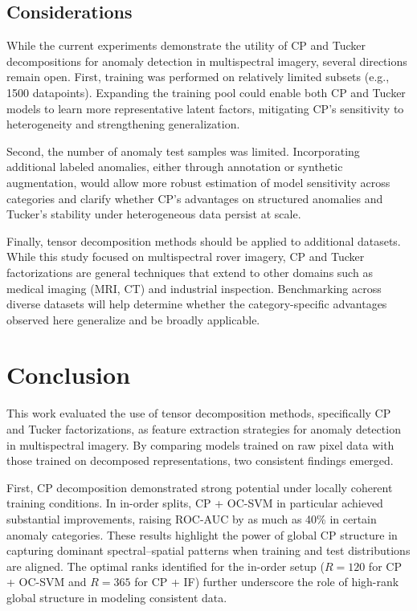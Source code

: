 \documentclass[pdflatex,sn-mathphys-ay]{sn-jnl}
\begin{document}
\subsection{Considerations}

While the current experiments demonstrate the utility of CP and Tucker decompositions for anomaly detection in multispectral imagery, several directions remain open. First, training was performed on relatively limited subsets (e.g., 1500 datapoints). Expanding the training pool could enable both CP and Tucker models to learn more representative latent factors, mitigating CP’s sensitivity to heterogeneity and strengthening generalization.  

Second, the number of anomaly test samples was limited. Incorporating additional labeled anomalies, either through annotation or synthetic augmentation, would allow more robust estimation of model sensitivity across categories and clarify whether CP’s advantages on structured anomalies and Tucker’s stability under heterogeneous data persist at scale.  

Finally, tensor decomposition methods should be applied to additional datasets. While this study focused on multispectral rover imagery, CP and Tucker factorizations are general techniques that extend to other domains such as medical imaging (MRI, CT) and industrial inspection. Benchmarking across diverse datasets will help determine whether the category-specific advantages observed here generalize and be broadly applicable.  


\section{Conclusion}
\label{sec:conclusion}

This work evaluated the use of tensor decomposition methods, specifically CP and Tucker factorizations, as feature extraction strategies for anomaly detection in multispectral imagery. By comparing models trained on raw pixel data with those trained on decomposed representations, two consistent findings emerged.    

First, CP decomposition demonstrated strong potential under locally coherent training conditions. In in-order splits, CP + OC-SVM in particular achieved substantial improvements, raising ROC-AUC by as much as 40\% in certain anomaly categories. These results highlight the power of global CP structure in capturing dominant spectral–spatial patterns when training and test distributions are aligned. The optimal ranks identified for the in-order setup (\(R=120\) for CP + OC-SVM and \(R=365\) for CP + IF) further underscore the role of high-rank global structure in modeling consistent data.  
\end{document}
